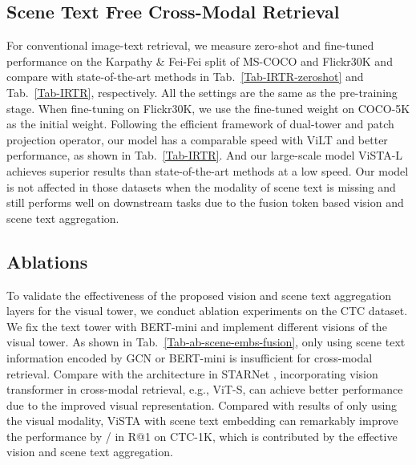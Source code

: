 \documentclass[10pt,twocolumn,letterpaper]{article}
\begin{document}
\subsection{Scene Text Free Cross-Modal Retrieval}
For conventional image-text retrieval, we measure zero-shot and fine-tuned performance on the Karpathy \& Fei-Fei split of MS-COCO and Flickr30K \cite{flickr30k} and compare with state-of-the-art methods in Tab.~\ref{Tab-IRTR-zeroshot} and Tab.~\ref{Tab-IRTR}, respectively. All the settings are the same as the pre-training stage. When fine-tuning on Flickr30K, we use the fine-tuned weight on COCO-5K as the initial weight. Following the efficient framework of dual-tower and patch projection operator, our model has a comparable speed with ViLT \cite{ViLT} and better performance, as shown in Tab.~\ref{Tab-IRTR}. And our large-scale model ViSTA-L achieves superior results than state-of-the-art methods at a low speed. 
Our model is not affected in those datasets when the modality of scene text is missing and still performs well on downstream tasks due to the fusion token based vision and scene text aggregation.


\subsection{Ablations}
To validate the effectiveness of the proposed vision and scene text aggregation layers for the visual tower, we conduct ablation experiments on the CTC dataset. We fix the text tower with BERT-mini and implement different visions of the visual tower. 
As shown in Tab.~\ref{Tab-ab-scene-embs-fusion}, only using scene text information encoded by GCN or BERT-mini is insufficient for cross-modal retrieval. Compare with the architecture in STARNet \cite{STARNet}, incorporating vision transformer in cross-modal retrieval, e.g., ViT-S, can achieve better performance due to the improved visual representation. Compared with results of only using the visual modality, ViSTA with scene text embedding can remarkably improve the performance by / in R@1 on CTC-1K, which is contributed by the effective vision and scene text aggregation.
\end{document}
